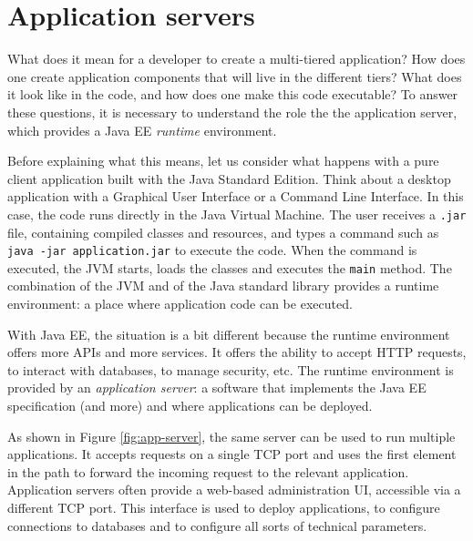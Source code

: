 \section{Application servers}

What does it mean for a developer to create a multi-tiered application? How does one create application components that will live in the different tiers? What does it look like in the code, and how does one make this code executable? To answer these questions, it is necessary to understand the role the the application server, which provides a Java EE \emph{runtime} environment.


Before explaining what this means, let us consider what happens with a pure client application built with the Java Standard Edition. Think about a desktop application with a Graphical User Interface or a Command Line Interface. In this case, the code runs directly in the Java Virtual Machine. The user receives a \texttt{.jar} file, containing compiled classes and resources, and types a command such as \texttt{java -jar application.jar} to execute the code. When the command is executed, the JVM starts, loads the classes and executes the \texttt{main} method. The combination of the JVM and of the Java standard library provides a runtime environment: a place where application code can be executed.

With Java EE, the situation is a bit different because the runtime environment offers more APIs and more services. It offers the ability to accept HTTP requests, to interact with databases, to manage security, etc. The runtime environment is provided by an \emph{application server}: a software that implements the Java EE specification (and more) and where applications can be deployed.

As shown in Figure \ref{fig:app-server}, the same server can be used to run multiple applications. It accepts requests on a single TCP port and uses the first element in the path to forward the incoming request to the relevant application. Application servers often provide a web-based administration UI, accessible via a different TCP port. This interface is used to deploy applications, to configure connections to databases and to configure all sorts of technical parameters.

